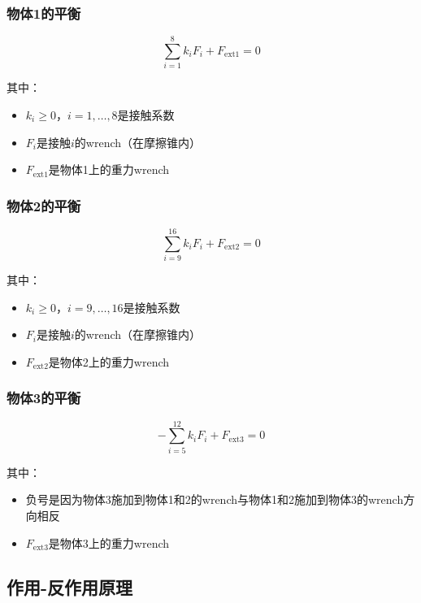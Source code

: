 \documentclass[12pt,a4paper]{article}
\begin{document}
\subsubsection{物体1的平衡}

\begin{equation}
\sum_{i=1}^8 k_i F_i + F_{\text{ext}1} = 0
\label{eq:body1}
\end{equation}

其中：
\begin{itemize}
    \item $k_i \geq 0$，$i = 1, \ldots, 8$是接触系数
    \item $F_i$是接触$i$的wrench（在摩擦锥内）
    \item $F_{\text{ext}1}$是物体1上的重力wrench
\end{itemize}

\subsubsection{物体2的平衡}

\begin{equation}
\sum_{i=9}^{16} k_i F_i + F_{\text{ext}2} = 0
\label{eq:body2}
\end{equation}

其中：
\begin{itemize}
    \item $k_i \geq 0$，$i = 9, \ldots, 16$是接触系数
    \item $F_i$是接触$i$的wrench（在摩擦锥内）
    \item $F_{\text{ext}2}$是物体2上的重力wrench
\end{itemize}

\subsubsection{物体3的平衡}

\begin{equation}
-\sum_{i=5}^{12} k_i F_i + F_{\text{ext}3} = 0
\label{eq:body3}
\end{equation}

其中：
\begin{itemize}
    \item 负号是因为物体3施加到物体1和2的wrench与物体1和2施加到物体3的wrench方向相反
    \item $F_{\text{ext}3}$是物体3上的重力wrench
\end{itemize}

\subsection{作用-反作用原理}
\end{document}
